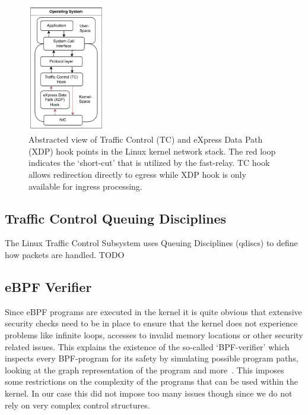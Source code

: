 \begin{figure}[htbp]
    \centering
    \includegraphics[width=0.3\textwidth]{figures/02_background/hook-point-locations.drawio.pdf}
    \caption{Abstracted view of Traffic Control (TC) and eXpress Data Path (XDP) hook points
    in the Linux kernel network stack.
    The red loop indicates the `short-cut' that is utilized by the fast-relay.
    TC hook allows redirection directly to egress while XDP hook is only available
    for ingress processing.
    }\label{fig:ebpf-hooks}
\end{figure}

\subsection{Traffic Control Queuing Disciplines}
The Linux Traffic Control Subsystem uses Queuing Disciplines (qdiscs) to define how packets
are handled. TODO

\subsection{eBPF Verifier}
Since eBPF programs are executed in the kernel it is quite obvious that extensive
security checks need to be in place to ensure that the kernel does not experience 
problems like infinite loops, accesses to invalid memory locations or other security 
related issues.
This explains the existence of the so-called `BPF-verifier' which inspects 
every BPF-program for its safety by simulating possible program paths, 
looking at the graph representation of the program and more~\parencite{ebpf-verifier}.
This imposes some restrictions on the complexity of the programs that can be 
used within the kernel.
In our case this did not impose too many issues though since we do not rely on 
very complex control structures.

